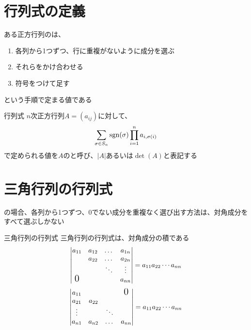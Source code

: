 \documentclass[../../../topic_linear-algebra]{subfiles}
\begin{document}
\sectionline
\section{行列式の定義}

ある正方行列のは、
\begin{enumerate}
  \item 各列から1つずつ、行に重複がないように成分を選ぶ
  \item それらをかけ合わせる
  \item 符号をつけて足す
\end{enumerate}
という手順で定まる値である

\begin{definition}{行列式}
  $n$次正方行列$A = (a_{ij})$に対して、
  \begin{equation*}
    \sum_{\sigma \in S_n} \operatorname{sgn}(\sigma) \prod_{i=1}^n a_{i,\sigma(i)}
  \end{equation*}
  で定められる値を$A$のと呼び、$|A|$あるいは$\det(A)$と表記する
\end{definition}

\sectionline
\section{三角行列の行列式}

の場合、各列から1つずつ、0でない成分を重複なく選び出す方法は、対角成分をすべて選ぶしかない

\begin{theorem}{三角行列の行列式}\label{thm:det-of-triangular-matrix}
  三角行列の行列式は、対角成分の積である
  \begin{equation*}
    \left|\begin{matrix}
      a_{11}           & a_{12} & \dots  & a_{1n} \\
                       & a_{22} & \dots  & a_{2n} \\
                       &        & \ddots & \vdots \\
      \text{\Large{0}} &        &        & a_{nn}
    \end{matrix}\right| = a_{11} a_{22} \cdots a_{nn}
  \end{equation*}
  \begin{equation*}
    \left|\begin{matrix}
      a_{11} &        &        & \text{\Large{0}} \\
      a_{21} & a_{22}                             \\
      \vdots &        & \ddots                    \\
      a_{n1} & a_{n2} & \dots  & a_{nn}
    \end{matrix}\right| = a_{11} a_{22} \cdots a_{nn}
  \end{equation*}
\end{theorem}
\end{document}

